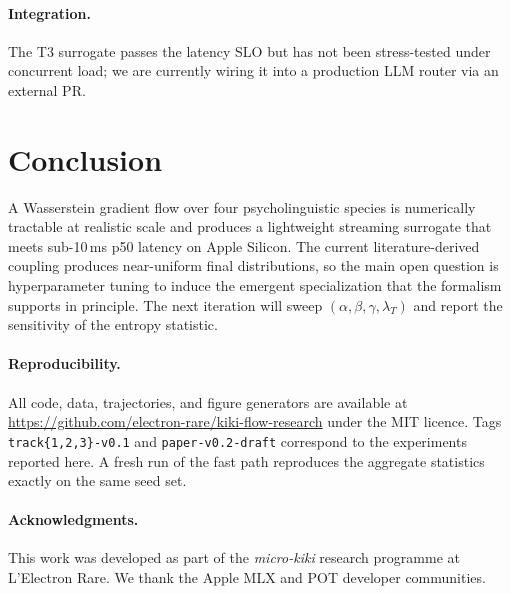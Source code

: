 \documentclass[11pt]{article}
\begin{document}
\paragraph{Integration.} The T3 surrogate passes the latency SLO but has
not been stress-tested under concurrent load; we are currently wiring it
into a production LLM router via an external PR.

\section{Conclusion}
\label{sec:conclusion}

A Wasserstein gradient flow over four psycholinguistic species is
numerically tractable at realistic scale and produces a lightweight
streaming surrogate that meets sub-10\,ms p50 latency on Apple Silicon.
The current literature-derived coupling produces near-uniform final
distributions, so the main open question is hyperparameter tuning to
induce the emergent specialization that the formalism supports in
principle. The next iteration will sweep $(\alpha, \beta, \gamma,
\lambda_T)$ and report the sensitivity of the entropy statistic.

\paragraph{Reproducibility.}
All code, data, trajectories, and figure generators are available at
\url{https://github.com/electron-rare/kiki-flow-research} under the MIT
licence. Tags \texttt{track\{1,2,3\}-v0.1} and \texttt{paper-v0.2-draft}
correspond to the experiments reported here. A fresh run of the fast
path reproduces the aggregate statistics exactly on the same seed set.

\paragraph{Acknowledgments.}
This work was developed as part of the \emph{micro-kiki} research
programme at L'Electron Rare. We thank the Apple MLX and POT developer
communities.



\end{document}
